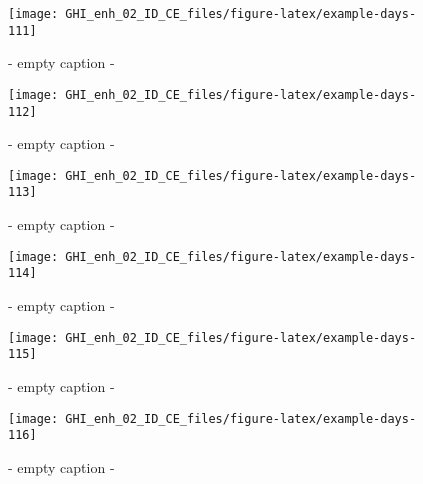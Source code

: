 \documentclass[
  10pt,
  a4paper,oneside]{article}
\begin{document}
\begin{figure}[H]

{\centering \texttt{[image: GHI\_enh\_02\_ID\_CE\_files/figure-latex/example-days-111]} 

}

\caption{ - empty caption - }\label{fig:example-days-111}
\end{figure}

\begin{figure}[H]

{\centering \texttt{[image: GHI\_enh\_02\_ID\_CE\_files/figure-latex/example-days-112]} 

}

\caption{ - empty caption - }\label{fig:example-days-112}
\end{figure}

\begin{figure}[H]

{\centering \texttt{[image: GHI\_enh\_02\_ID\_CE\_files/figure-latex/example-days-113]} 

}

\caption{ - empty caption - }\label{fig:example-days-113}
\end{figure}

\begin{figure}[H]

{\centering \texttt{[image: GHI\_enh\_02\_ID\_CE\_files/figure-latex/example-days-114]} 

}

\caption{ - empty caption - }\label{fig:example-days-114}
\end{figure}

\begin{figure}[H]

{\centering \texttt{[image: GHI\_enh\_02\_ID\_CE\_files/figure-latex/example-days-115]} 

}

\caption{ - empty caption - }\label{fig:example-days-115}
\end{figure}

\begin{figure}[H]

{\centering \texttt{[image: GHI\_enh\_02\_ID\_CE\_files/figure-latex/example-days-116]} 

}

\caption{ - empty caption - }\label{fig:example-days-116}
\end{figure}
\end{document}
